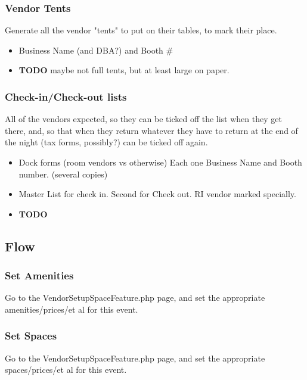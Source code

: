 \documentclass[captions=tablesignature]{scrartcl}
\begin{document}
\subsubsection{Vendor Tents}
\label{sec-3-1-19}
Generate all the vendor "tents" to put on their tables, to mark
their place.
\begin{itemize}
\item Business Name (and DBA?) and Booth \#
\end{itemize}
\begin{itemize}
\item {\bfseries\sffamily TODO} maybe not full tents, but at least large on paper.
\label{sec-3-1-19-1}
\end{itemize}

\subsubsection{Check-in/Check-out lists}
\label{sec-3-1-20}
All of the vendors expected, so they can be ticked off the list
when they get there, and, so that when they return whatever they
have to return at the end of the night (tax forms, possibly?) can
be ticked off again.
\begin{itemize}
\item Dock forms (room vendors vs otherwise) Each one Business Name
and Booth number.  (several copies)
\item Master List for check in.  Second for Check out. RI vendor
marked specially.
\end{itemize}
\begin{itemize}
\item {\bfseries\sffamily TODO} 
\label{sec-3-1-20-1}
\end{itemize}

\subsection{Flow}
\label{sec-3-2}
\subsubsection{Set Amenities}
\label{sec-3-2-1}
Go to the VendorSetupSpaceFeature.php page, and set the
appropriate amenities/prices/et al for this event.

\subsubsection{Set Spaces}
\label{sec-3-2-2}
Go to the VendorSetupSpaceFeature.php page, and set the
appropriate spaces/prices/et al for this event.
\end{document}
